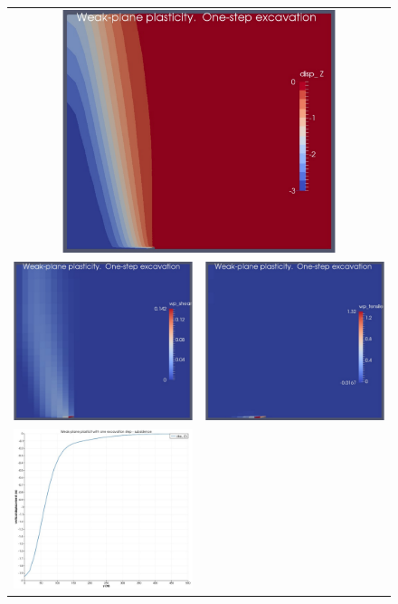 \documentclass[]{scrreprt}
\begin{document}
\begin{figure}[p]
\begin{center}
\begin{tabular}{cc}
\multicolumn{2}{c}{\includegraphics[width=8cm]{wp_only_one_step_disp.pdf}}
  \\
\includegraphics[width=6cm]{wp_only_one_step_shear.pdf} &
\includegraphics[width=6cm]{wp_only_one_step_tensile.pdf} \\
\includegraphics[width=6cm]{wp_only_one_step_subsidence.pdf} &

\end{tabular}
\end{center}
\end{figure}
\end{document}
